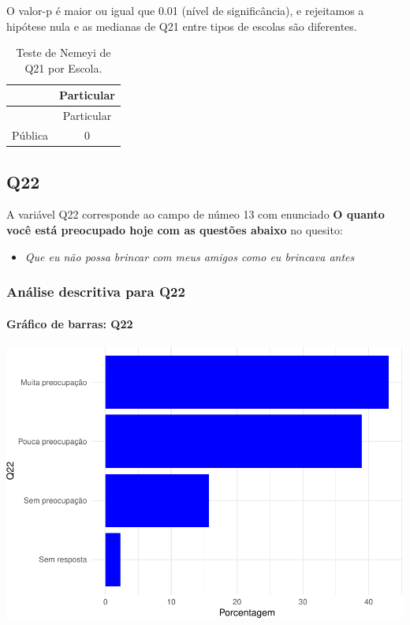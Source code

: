 \documentclass[]{article}
\providecommand{\tightlist}{%
  \setlength{\itemsep}{0pt}\setlength{\parskip}{0pt}}
\let\oldparagraph\paragraph
\renewcommand{\paragraph}[1]{\oldparagraph{#1}\mbox{}}
\begin{document}
O valor-p é maior ou igual que 0.01 (nível de significância), e rejeitamos a hipótese nula e as medianas de Q21 entre tipos de escolas são diferentes.

\begin{longtable}[]{@{}lc@{}}
\caption{\label{tab:unnamed-chunk-475}Teste de Nemeyi de Q21 por Escola.}\tabularnewline
\toprule
& Particular\tabularnewline
\midrule
\endfirsthead
\toprule
& Particular\tabularnewline
\midrule
\endhead
Pública & 0\tabularnewline
\bottomrule
\end{longtable}

\cleardoublepage

\hypertarget{q22}{%
\subsection{Q22}\label{q22}}

A variável Q22 corresponde ao campo de númeo 13 com enunciado \textbf{O quanto você está preocupado hoje com as questões abaixo} no quesito:

\begin{itemize}
\tightlist
\item
  \emph{Que eu não possa brincar com meus amigos como eu brincava antes}
\end{itemize}

\hypertarget{anuxe1lise-descritiva-para-q22}{%
\subsubsection{Análise descritiva para Q22}\label{anuxe1lise-descritiva-para-q22}}

\hypertarget{gruxe1fico-de-barras-q22}{%
\paragraph{Gráfico de barras: Q22}\label{gruxe1fico-de-barras-q22}}

\begin{center}\includegraphics[width=0.75\linewidth]{relatorio_covid19_files/figure-latex/unnamed-chunk-482-1} \end{center}
\end{document}
